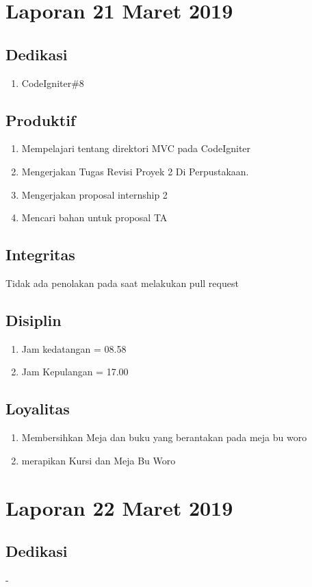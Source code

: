\section{Laporan 21 Maret 2019}
\subsection{Dedikasi}
\begin{enumerate}
\item CodeIgniter\#8
\end{enumerate}
\subsection{Produktif}
\begin{enumerate}
\item Mempelajari tentang direktori MVC pada CodeIgniter
\item Mengerjakan Tugas Revisi Proyek 2 Di Perpustakaan.
\item Mengerjakan proposal internship 2
\item Mencari bahan untuk proposal TA
\end{enumerate}
\subsection{Integritas}
Tidak ada penolakan pada saat melakukan pull request
\subsection{Disiplin}
\begin{enumerate}
\item Jam kedatangan =  08.58
\item Jam Kepulangan = 17.00
\end{enumerate}
\subsection{Loyalitas}
\begin{enumerate}
\item Membersihkan Meja dan buku yang berantakan pada meja bu woro
\item merapikan Kursi dan Meja Bu Woro
\end{enumerate}

\section{Laporan 22 Maret 2019}
\subsection{Dedikasi}
-

